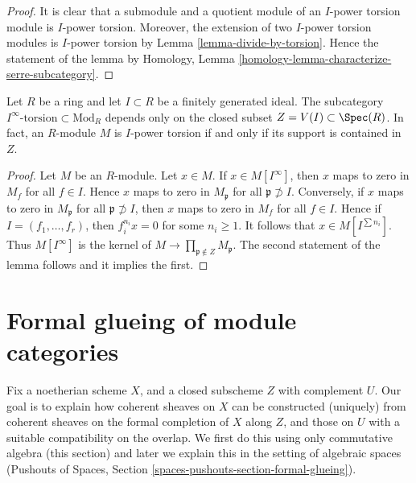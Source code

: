 \begin{proof}
It is clear that a submodule and a quotient module of an $I$-power
torsion module is $I$-power torsion. Moreover, the extension
of two $I$-power torsion modules is $I$-power torsion by
Lemma \ref{lemma-divide-by-torsion}.
Hence the statement of the lemma by
Homology, Lemma \ref{homology-lemma-characterize-serre-subcategory}.
\end{proof}

\begin{lemma}
\label{lemma-local-cohomology-closed}
Let $R$ be a ring and let $I \subset R$ be a finitely generated ideal.
The subcategory $I^\infty\text{-torsion} \subset \text{Mod}_R$
depends only on the closed subset $Z = V(I) \subset \Spec(R)$.
In fact, an $R$-module $M$ is $I$-power torsion if and only if its
support is contained in $Z$.
\end{lemma}

\begin{proof}
Let $M$ be an $R$-module. Let $x \in M$. If $x \in M[I^\infty]$, then $x$
maps to zero in $M_f$ for all $f \in I$. Hence $x$ maps to zero in
$M_\mathfrak p$ for all $\mathfrak p \not \supset I$. Conversely, if $x$
maps to zero in $M_\mathfrak p$ for all $\mathfrak p \not \supset I$,
then $x$ maps to zero in $M_f$ for all $f \in I$. Hence if
$I = (f_1, \ldots, f_r)$, then $f_i^{n_i}x = 0$ for some $n_i \geq 1$.
It follows that $x \in M[I^{\sum n_i}]$. Thus $M[I^\infty]$ is
the kernel of $M \to \prod_{\mathfrak p \not \in Z} M_\mathfrak p$.
The second statement of the lemma follows and it implies the first.
\end{proof}






\section{Formal glueing of module categories}
\label{section-formal-glueing}

\noindent
Fix a noetherian scheme $X$, and a closed subscheme $Z$ with complement $U$.
Our goal is to explain how coherent sheaves on $X$ can be constructed
(uniquely) from coherent sheaves on the formal completion of $X$ along
$Z$, and those on $U$ with a suitable compatibility on the overlap.
We first do this using only commutative algebra (this section) and
later we explain this in the setting of algebraic spaces
(Pushouts of Spaces, Section \ref{spaces-pushouts-section-formal-glueing}).

